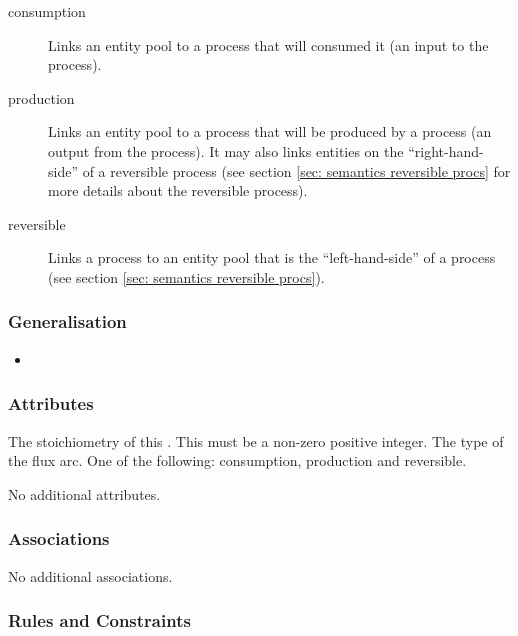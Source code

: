 \begin{description}
\item[consumption] Links an entity pool to a process that will
  consumed it (an input to the process).
\item[production] Links an entity pool to a process that will be
produced by a process (an output from the process). It may also
links entities on the ``right-hand-side'' of a reversible process (see
section \ref{sec: semantics reversible procs} for more details about the
reversible process).
\item[reversible] Links a process to an entity pool that is the
  ``left-hand-side'' of a process (see section  \ref{sec: semantics reversible procs}).
\end{description}

\subsubsection{Generalisation}

\begin{itemize}
\item {}
\end{itemize}

\subsubsection{Attributes}

\begin{attributes}
   The stoichiometry of this
  . This must be a non-zero positive integer.
   The type of the flux arc. One of the
  following: consumption, production and reversible.
\end{attributes}

No additional attributes.

\subsubsection{Associations}

No additional associations.

\subsubsection{Rules and Constraints}

